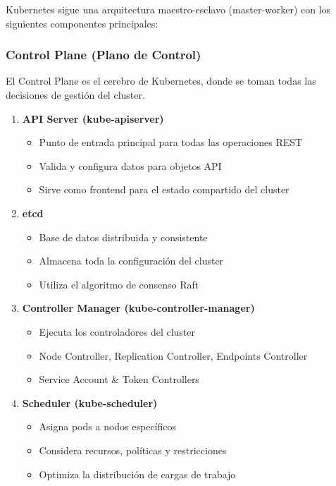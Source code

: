 \documentclass[11pt,a4paper]{article}
\begin{document}
Kubernetes sigue una arquitectura maestro-esclavo (master-worker) con los siguientes componentes principales:

\subsubsection{Control Plane (Plano de Control)}

\begin{tipbox}
El Control Plane es el cerebro de Kubernetes, donde se toman todas las decisiones de gestión del cluster.
\end{tipbox}

\begin{enumerate}
    \item \textbf{\textcolor{k8sblue}{API Server (kube-apiserver)}}
    \begin{itemize}
        \item Punto de entrada principal para todas las operaciones REST
        \item Valida y configura datos para objetos API
        \item Sirve como frontend para el estado compartido del cluster
    \end{itemize}
    
    \item \textbf{\textcolor{k8ssuccess}{etcd}}
    \begin{itemize}
        \item Base de datos distribuida y consistente
        \item Almacena toda la configuración del cluster
        \item Utiliza el algoritmo de consenso Raft
    \end{itemize}
    
    \item \textbf{\textcolor{k8swarning}{Controller Manager (kube-controller-manager)}}
    \begin{itemize}
        \item Ejecuta los controladores del cluster
        \item Node Controller, Replication Controller, Endpoints Controller
        \item Service Account \& Token Controllers
    \end{itemize}
    
    \item \textbf{\textcolor{k8ssteelblue}{Scheduler (kube-scheduler)}}
    \begin{itemize}
        \item Asigna pods a nodos específicos
        \item Considera recursos, políticas y restricciones
        \item Optimiza la distribución de cargas de trabajo
    \end{itemize}
\end{enumerate}
\end{document}
